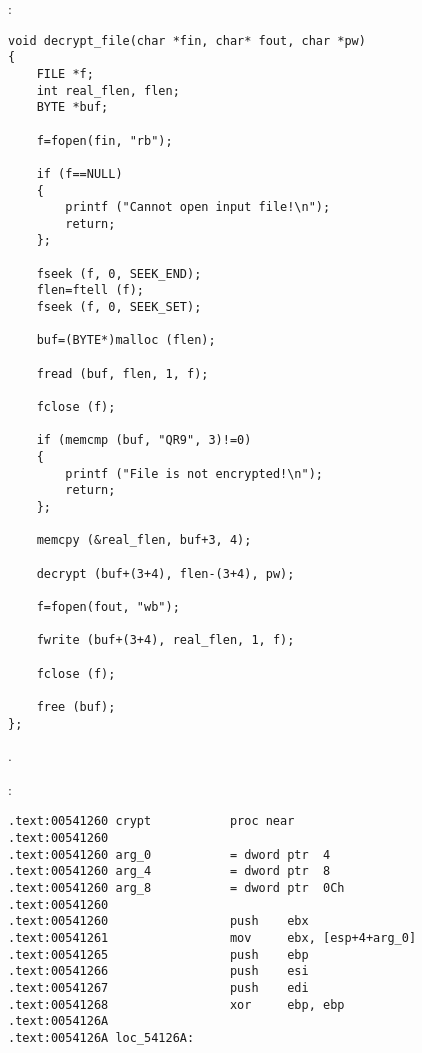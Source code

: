 :

\begin{lstlisting}
void decrypt_file(char *fin, char* fout, char *pw)
{
	FILE *f;
	int real_flen, flen;
	BYTE *buf;

	f=fopen(fin, "rb");
	
	if (f==NULL)
	{
		printf ("Cannot open input file!\n");
		return;
	};

	fseek (f, 0, SEEK_END);
	flen=ftell (f);
	fseek (f, 0, SEEK_SET);

	buf=(BYTE*)malloc (flen);

	fread (buf, flen, 1, f);

	fclose (f);

	if (memcmp (buf, "QR9", 3)!=0)
	{
		printf ("File is not encrypted!\n");
		return;
	};

	memcpy (&real_flen, buf+3, 4);

	decrypt (buf+(3+4), flen-(3+4), pw);
	
	f=fopen(fout, "wb");

	fwrite (buf+(3+4), real_flen, 1, f);

	fclose (f);

	free (buf);
};
\end{lstlisting}

.

 :

\begin{lstlisting}
.text:00541260 crypt           proc near
.text:00541260
.text:00541260 arg_0           = dword ptr  4
.text:00541260 arg_4           = dword ptr  8
.text:00541260 arg_8           = dword ptr  0Ch
.text:00541260
.text:00541260                 push    ebx
.text:00541261                 mov     ebx, [esp+4+arg_0]
.text:00541265                 push    ebp
.text:00541266                 push    esi
.text:00541267                 push    edi
.text:00541268                 xor     ebp, ebp
.text:0054126A
.text:0054126A loc_54126A:
\end{lstlisting}


